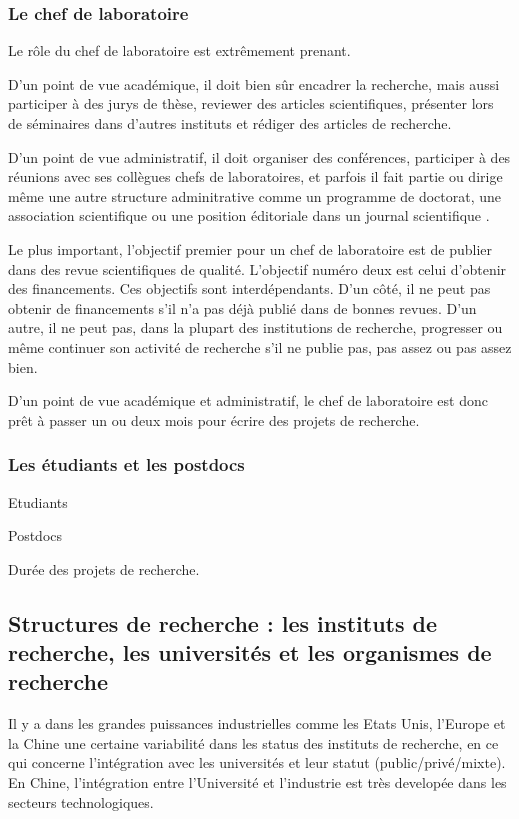 \documentclass[24pt]{article}
\begin{document}
\subsubsection{Le chef de laboratoire}

Le rôle du chef de laboratoire est extrêmement prenant. 

D'un point de vue académique, il doit bien sûr encadrer la recherche, mais aussi participer à des jurys de thèse, reviewer des articles scientifiques, 
présenter lors de séminaires dans d'autres instituts et rédiger des articles de recherche.


D'un point de vue administratif, il doit organiser des conférences, participer à des réunions avec ses collègues chefs de laboratoires, et parfois il fait partie ou dirige même une autre structure adminitrative comme un programme de doctorat, une association scientifique ou une position éditoriale dans un journal scientifique . 

Le plus important, l'objectif premier pour un chef de laboratoire est de publier dans des revue scientifiques de qualité. L'objectif numéro deux est celui d'obtenir des financements. Ces objectifs sont interdépendants. D'un côté, il ne peut pas obtenir de financements s'il n'a pas déjà publié dans de bonnes revues. D'un autre, il ne peut pas, dans la plupart des institutions de recherche, progresser ou même continuer son activité de recherche  s'il ne publie pas, pas assez ou pas assez bien. 

 
D'un point de vue académique et administratif, le chef de laboratoire est donc prêt à passer un ou deux mois pour écrire des projets de recherche. 


\subsubsection{Les étudiants et les postdocs}

Etudiants

Postdocs


Durée des projets de recherche.




\subsection{Structures de recherche : les instituts de recherche, les universités et les  organismes de recherche}

Il y a dans les grandes puissances industrielles comme les Etats Unis, l'Europe et la Chine une certaine variabilité dans les status des instituts de recherche, en ce qui concerne l'intégration avec les universités et leur statut (public/privé/mixte). En Chine, l'intégration entre l'Université et l'industrie est très developée dans les secteurs technologiques.
\end{document}
